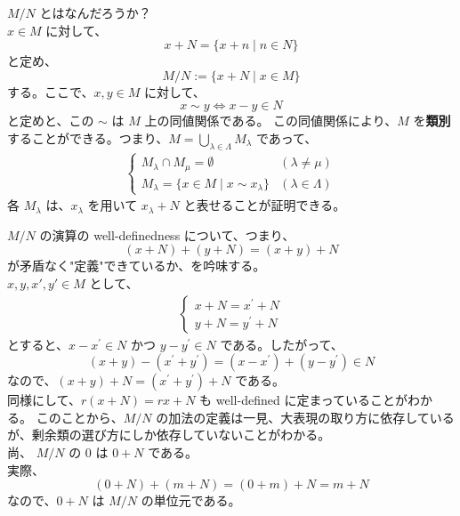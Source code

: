 \documentclass[article,paper=a4paper]{jlreq}
\begin{document}
\begin{rem}
  $M/N$ とはなんだろうか？\\
  $x \in M$ に対して、
  \[x+N = \{x+n \mid n\in N\} \]
  と定め、
  \[M/N := \{x+N \mid x\in M\}\]
  する。ここで、$x, y \in M$ に対して、
  \[x \sim y \iff x - y \in N\]
  と定めと、この $\sim$ は $M$ 上の同値関係である。
  この同値関係により、$M$ を\textbf{類別}することができる。つまり、$M = \bigcup_{\lambda \in \Lambda} M_{\lambda} $ であって、
  \begin{align*}
    \begin{cases}
      M_{\lambda} \cap M_{\mu} = \emptyset & (\lambda \neq \mu) \\
      M_{\lambda} = \{x \in M \mid x \sim x_{\lambda}\} & (\lambda \in \Lambda)
    \end{cases}
  \end{align*}
  各 $M_{\lambda}$ は、$x_{\lambda}$ を用いて $x_{\lambda}+N$ と表せることが証明できる。
\end{rem}

\begin{rem}
  \quad $M/N$ の演算の well-definedness について、つまり、
  \[(x+N)+(y+N)=(x+y)+N\]
  が矛盾なく"定義"できているか、を吟味する。\\
  $x, y, x', y' \in M$ として、
  \begin{align*}
    \begin{cases}
      x+N = x^{\prime}+N \\
      y+N = y^{\prime}+N
    \end{cases}
  \end{align*}
  とすると、$x - x^{\prime} \in N$ かつ $y - y^{\prime} \in N$ である。したがって、
  \[(x+y) - (x^{\prime} + y^{\prime}) = (x - x^{\prime}) + (y - y^{\prime}) \in N\]
  なので、$(x+y)+N = (x^{\prime} + y^{\prime}) + N$  である。\\
  \quad 同様にして、$r(x+N) = rx + N$ も well-defined に定まっていることがわかる。
  このことから、$M/N$ の加法の定義は一見、大表現の取り方に依存しているが、剰余類の選び方にしか依存していないことがわかる。\\
  \quad 尚、 $M/N$ の $0$ は $0+N$ である。\\
  実際、
  \[(0+N)+(m+N) = (0+m)+N=m+N\]
  なので、$0+N$ は $M/N$ の単位元である。
\end{rem}

\end{document}
